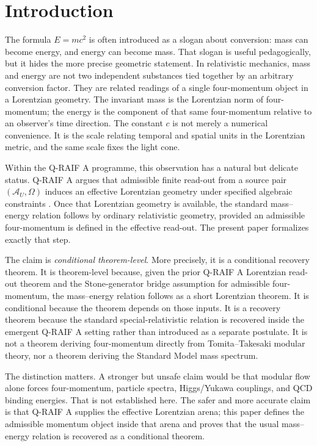 \documentclass[12pt,a4paper]{article}
\theoremstyle{definition}
\theoremstyle{remark}
\newcommand{\AU}{\mathcal{A}_U}
\newcommand{\Omegastate}{\Omega}
\begin{document}
\clearpage
\tableofcontents
\clearpage

\section{Introduction}
\label{sec:introduction}

The formula $E=mc^2$ is often introduced as a slogan about conversion: mass can become energy, and energy can become mass. That slogan is useful pedagogically, but it hides the more precise geometric statement. In relativistic mechanics, mass and energy are not two independent substances tied together by an arbitrary conversion factor. They are related readings of a single four-momentum object in a Lorentzian geometry. The invariant mass is the Lorentzian norm of four-momentum; the energy is the component of that same four-momentum relative to an observer's time direction. The constant $c$ is not merely a numerical convenience. It is the scale relating temporal and spatial units in the Lorentzian metric, and the same scale fixes the light cone.

Within the Q-RAIF A programme, this observation has a natural but delicate status. Q-RAIF A argues that admissible finite read-out from a source pair $(\AU,\Omegastate)$ induces an effective Lorentzian geometry under specified algebraic constraints \cite{Liu2026QRAIFA}. Once that Lorentzian geometry is available, the standard mass--energy relation follows by ordinary relativistic geometry, provided an admissible four-momentum is defined in the effective read-out. The present paper formalizes exactly that step.

The claim is \emph{conditional theorem-level}. More precisely, it is a conditional recovery theorem. It is theorem-level because, given the prior Q-RAIF A Lorentzian read-out theorem and the Stone-generator bridge assumption for admissible four-momentum, the mass--energy relation follows as a short Lorentzian theorem. It is conditional because the theorem depends on those inputs. It is a recovery theorem because the standard special-relativistic relation is recovered inside the emergent Q-RAIF A setting rather than introduced as a separate postulate. It is not a theorem deriving four-momentum directly from Tomita--Takesaki modular theory, nor a theorem deriving the Standard Model mass spectrum.

The distinction matters. A stronger but unsafe claim would be that modular flow alone forces four-momentum, particle spectra, Higgs/Yukawa couplings, and QCD binding energies. That is not established here. The safer and more accurate claim is that Q-RAIF A supplies the effective Lorentzian arena; this paper defines the admissible momentum object inside that arena and proves that the usual mass--energy relation is recovered as a conditional theorem.
\end{document}
